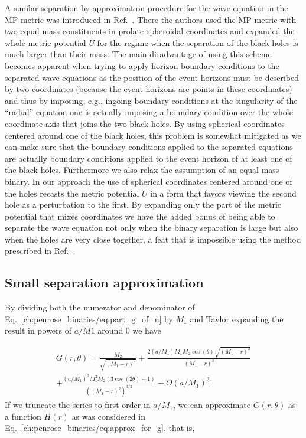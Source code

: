 A similar separation by approximation procedure for the wave equation in the MP metric was introduced in Ref.~\cite{LAURA2019}. There the authors used the MP metric with two equal mass constituents in prolate spheroidal coordinates and expanded the whole metric potential $U$ for the regime when the separation of the black holes is much larger than their mass. The main disadvantage of using this scheme becomes apparent when trying to apply horizon boundary conditions to the separated wave equations as the position of the event horizons must be described by two coordinates (because the event horizons are points in these coordinates) and thus by imposing, e.g., ingoing boundary conditions at the singularity of the ``radial'' equation one is actually imposing a boundary condition over the whole coordinate axis that joins the two black holes. By using spherical coordinates centered around one of the black holes, this problem is somewhat mitigated as we can make sure that the boundary conditions applied to the separated equations are actually boundary conditions applied to the event horizon of at least one of the black holes. Furthermore we also relax the assumption of an equal mass binary. In our approach the use of spherical coordinates centered around one of the holes recasts the metric potential $U$ in a form that favors viewing the second hole as a perturbation to the first. By expanding only the part of the metric potential that mixes coordinates we have the added bonus of being able to separate the wave equation not only when the binary separation is large but also when the holes are very close together, a feat that is impossible using the method prescribed in Ref.~\cite{LAURA2019}.

\subsection{Small separation approximation}

By dividing both the numerator and denominator of Eq.~\eqref{ch:penrose_binaries/eq:part_g_of_u} by $M_1$ and Taylor expanding the result in powers of $a/M1$ around $0$ we have

\begin{multline}
  G(r,\theta) = \frac{M_2}{\sqrt{(M_1-r)^2}} + \frac{2 (a/M_1)  M_1 M_2 \cos (\theta ) \sqrt{(M_1-r)^2}}{(M_1-r)^3} \\
  + \frac{(a/M_1) ^2 M_1^2 M_2 (3 \cos (2 \theta )+1)}{\left((M_1-r)^2\right)^{3/2}} + O(a/M_1)^3.
  \label{ch:penrose_binaries/eq:g_taylor_exp_small}
\end{multline}
%
If we truncate the series to first order in $a/M_1$, we can approximate $G(r,\theta)$ as a function $H(r)$ as was considered in Eq.~\eqref{ch:penrose_binaries/eq:approx_for_g}, that is,

